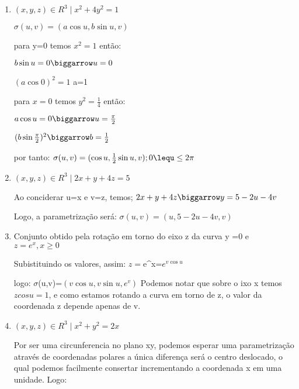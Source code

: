\documentclass[11pt,a4paper]{article}
\begin{document}
\begin{enumerate}
	\item $(x,y,z)\in R^{3}\mid x^{2}+4y^{2}=1$ 
	
	$\sigma(u,v)=(a\cos u, b\sin u, v)$\newline

	para  y=0 temos $x^{2} =1$ então: 
	
	$b\sin u =0 \biggarrow u=0$ 
	
	$(a\cos0)^{2}=1$ \biggarrow a=1\newline
	
	para $x=0$ temos $y^{2}=\frac{1}{4}$ então:
	
	$a\cos u=0 \biggarrow u=\frac{\pi}{2}$ 
	
	$(b\sin \frac{\pi}{2})^{2} \biggarrow b=\frac{1}{2}$ \newline

	por tanto:\newline
	$\sigma(u,v)=(\cos u, \frac{1}{2}\sin u, v); 0\lequ\leq2\pi $\newline
	
	\item $(x,y,z)\in R^{3}\mid 2x+y+4z=5$ 
	
	Ao conciderar u=x e v=z, temos; \newline
	$ 2x+y+4z \biggarrow y=5-2u-4v$\newline
	
	Logo, a parametrização será:\newline
	$\sigma(u,v)=(u, 5-2u-4v, v)$\newline
	
	
	\item Conjunto obtido pela rotação em torno do eixo z da curva y =0 e $z=e^{x}, x\geq 0 $\newline
	
	Subistituindo os valores, assim: \newline
	$z=$e^{x}=$e^{v\cos u}$ \newline
	
	logo: \newline
	$\sigma$(u,v)=$(v\cos u, v\sin u ,e^{v})$ \newline
	Podemos notar que sobre o ixo x temos $zcos u=1$, e como estamos rotando a curva em torno de z, o valor da coordenada z depende apenas de v.\newline
	
	
	\item $(x,y,z)\in R^{3}\mid x^{2}+y^{2}=2x$
	
	Por ser uma circunferencia no plano xy, podemos esperar uma parametrização através de coordenadas polares a única diferença será o centro deslocado, o qual podemos facilmente consertar incrementando a coordenada x em uma unidade. Logo: \newline 
	

\end{enumerate}
\end{document}
